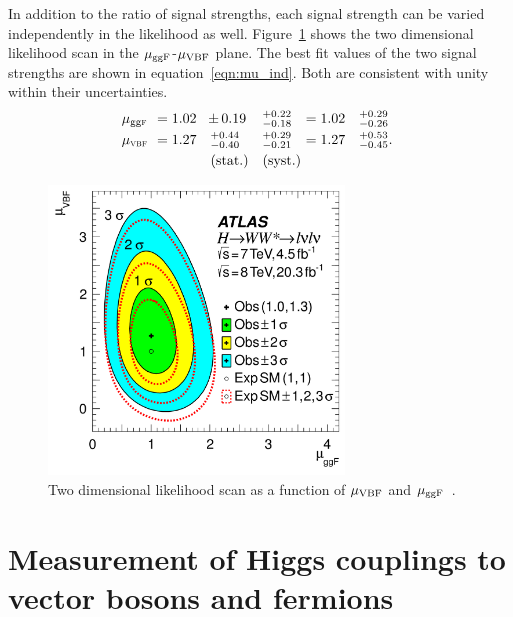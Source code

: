 In addition to the ratio of signal strengths, each signal strength can be varied independently in the likelihood as well. Figure~\ref{fig:mu_2d} shows the two dimensional likelihood scan in the $\mu_{{\rm ggF}}$-$\mu_{{\rm VBF}}$ plane. The best fit values of the two signal strengths are shown in equation~\ref{eqn:mu_ind}. Both are consistent with unity within their uncertainties.
%
\begin{equation}
\begin{array}{llllll}
\no\mu_{\scggF}\no&=1.02\no&{\PM}0.19           \np&^{+0.22}_{-0.18}\np&=1.02&^{+0.29}_{-0.26} \\ \clineskip
\no\mu_{\scVX} \no&=1.27\no&\,\,^{+0.44}_{-0.40}\np&^{+0.29}_{-0.21}\np&=1.27&^{+0.53}_{-0.45}.\\ \clineskip
                     &        & ~\textrm{(stat.)}     &\textrm{(syst.)}\np
\end{array}
\label{eqn:mu_ind}
\end{equation}

\begin{figure}[h!]
  \centering
  \captionsetup{justification=centering}

  \includegraphics[width=0.7\textwidth]{figures/WW_muind}
  \caption{Two dimensional likelihood scan as a function of $\mu_{{\rm VBF}}$ and $\mu_{{\rm ggF}}$~\cite{WW2015}.}
  \label{fig:mu_2d}
\end{figure}

\section{Measurement of Higgs couplings to vector bosons and fermions}

